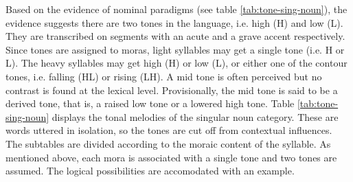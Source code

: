 Based on the evidence of nominal paradigms (see table \ref{tab:tone-sing-noun}),
 the evidence suggests there are two tones in the language, i.e. high (H) and
low (L).
They are transcribed on segments with an acute and a grave  accent respectively.
Since tones are assigned to moras, light syllables may get a single tone (i.e. H
or L). The heavy syllables may get high (H) or low (L), or either one of the
contour tones, i.e. falling (HL) or rising (LH). A mid tone is often perceived
but no contrast is found  at the lexical level. Provisionally,  the
mid tone is said to be a derived tone, that is, a raised low tone  or a lowered
high tone.
Table \ref{tab:tone-sing-noun} displays  the tonal melodies of the singular noun
category.  These are words uttered in isolation, so the tones are cut off from
contextual influences. The subtables are divided according to the 
moraic content of the syllable. As mentioned above, each mora is associated with
a single tone
and two tones are assumed. The  logical possibilities are accomodated with an
example.

